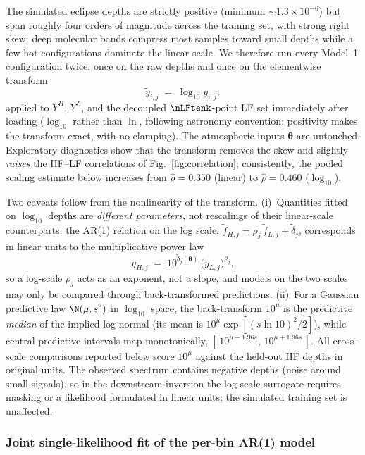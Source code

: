The simulated eclipse depths are strictly positive (minimum
${\sim}1.3\times10^{-6}$) but span roughly four orders of magnitude across
the training set, with strong right skew: deep molecular bands compress most
samples toward small depths while a few hot configurations dominate the linear
scale. We therefore run every Model~1 configuration twice, once on the raw
depths and once on the elementwise transform
\[
    \tilde y_{i,j} \;=\; \log_{10} y_{i,j},
\]
applied to $Y^{H}$, $Y^{L}$, and the decoupled $\nLFtenk$-point LF set
immediately after loading ($\log_{10}$ rather than $\ln$, following astronomy
convention; positivity makes the transform exact, with no clamping). The
atmospheric inputs $\boldsymbol\theta$ are untouched. Exploratory diagnostics
show that the transform removes the skew and slightly \emph{raises} the HF--LF
correlations of Fig.~\ref{fig:correlation}; consistently, the pooled scaling
estimate below increases from $\hat\rho=0.350$ (linear) to $\hat\rho=0.460$
($\log_{10}$).

Two caveats follow from the nonlinearity of the transform.
(i)~Quantities fitted on $\log_{10}$ depths are \emph{different parameters},
not rescalings of their linear-scale counterparts: the AR(1) relation on the
log scale,
$\tilde f_{H,j}=\rho_j\,\tilde f_{L,j}+\tilde\delta_j$, corresponds in linear
units to the multiplicative power law
\[
    y_{H,j} \;=\; 10^{\tilde\delta_j(\boldsymbol\theta)}\,
                  \bigl(y_{L,j}\bigr)^{\rho_j},
\]
so a log-scale $\rho_j$ acts as an exponent, not a slope, and models on the
two scales may only be compared through back-transformed predictions.
(ii)~For a Gaussian predictive law $\N(\mu,s^2)$ in $\log_{10}$ space, the
back-transform $10^{\mu}$ is the predictive \emph{median} of the implied
log-normal (its mean is $10^{\mu}\exp[(s\ln 10)^2/2]$), while central
predictive intervals map monotonically,
$[\,10^{\mu-1.96s},\,10^{\mu+1.96s}\,]$. All cross-scale comparisons reported
below score $10^{\mu}$ against the held-out HF depths in original units. The
observed spectrum contains negative depths (noise around small signals), so in
the downstream inversion the log-scale surrogate requires masking or a
likelihood formulated in linear units; the simulated training set is
unaffected.

\subsubsection{Joint single-likelihood fit of the per-bin AR(1) model}
\label{subsubsec:model1-jointfit}

